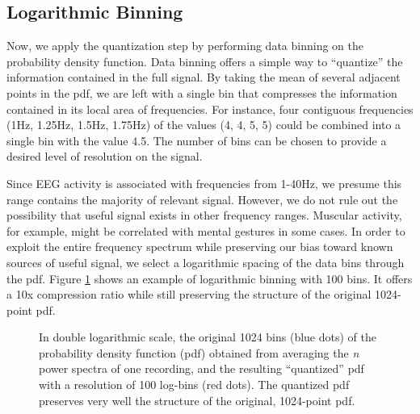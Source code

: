 
\subsection{Logarithmic Binning}

Now, we apply the quantization step by performing data binning on the probability density function. Data binning offers a simple way to ``quantize'' the information contained in the full signal. By taking the mean of several adjacent points in the pdf, we are left with a single bin that compresses the information contained in its local area of frequencies. For instance, four contiguous frequencies (1Hz, 1.25Hz, 1.5Hz, 1.75Hz) of the values (4, 4, 5, 5) could be combined into a single bin with the value 4.5. The number of bins can be chosen to provide a desired level of  resolution on the signal.


Since EEG activity is associated with frequencies from 1-40Hz, we presume this range contains the majority of relevant signal. However, we do not rule out the possibility that useful signal exists in other frequency ranges. Muscular activity, for example, might be correlated with mental gestures in some cases. In order to exploit the entire frequency spectrum while preserving our bias toward known sources of useful signal, we select a logarithmic spacing of the data bins through the pdf. Figure \ref{binnedEEGpowerspec} shows an example of logarithmic binning with 100 bins. It offers a 10x compression ratio while still preserving the structure of the original 1024-point pdf.

\begin{figure}[!h]
  \vspace{-0.2cm}
  \centering
  {}
\caption{In double logarithmic scale, the original 1024 bins (blue dots) of the probability density function (pdf) obtained from averaging the \emph{n} power spectra of one recording, and the resulting ``quantized''  pdf with a resolution of 100 log-bins (red dots). The quantized pdf preserves very well the structure of the original, 1024-point pdf. }
\label{binnedEEGpowerspec}
\vspace{-0.1cm}
\end{figure}

